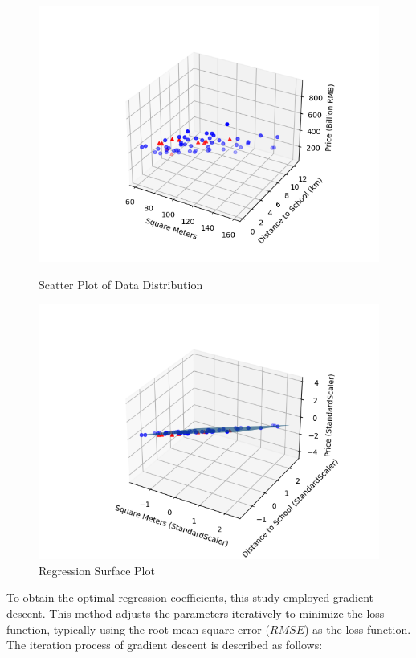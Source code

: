 \documentclass[a4paper, utf8]{ctexart}
\begin{document}
	\begin{figure}[htbp]
		\centering
		\begin{minipage}{.48\textwidth}
			\centering
			\includegraphics[width=.95\linewidth]{./figure/1(a)1.png}
			\caption{Scatter Plot of Data Distribution}
		\end{minipage}
		\begin{minipage}{.48\textwidth}
			\centering
			\includegraphics[width=.95\linewidth]{./figure/1(a)2.png}
			\caption{Regression Surface Plot}
		\end{minipage}
	\end{figure}
	
	To obtain the optimal regression coefficients, this study employed gradient descent. This method adjusts the parameters iteratively to minimize the loss function, typically using the root mean square error ($RMSE$) as the loss function. The iteration process of gradient descent is described as follows:
	
\end{document}

